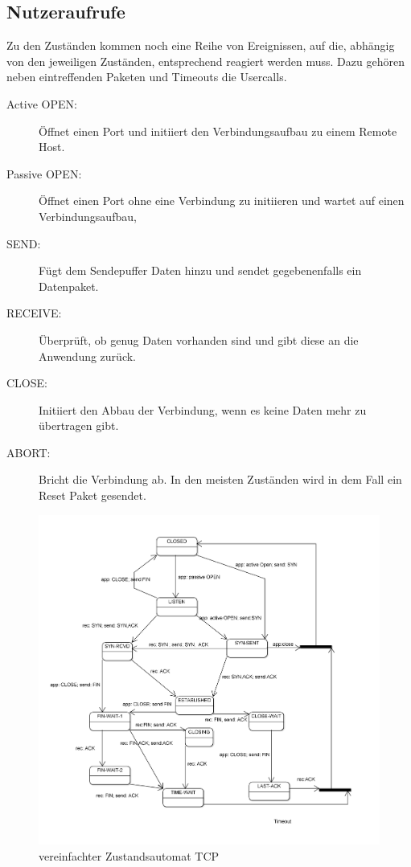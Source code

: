 \subsection{Nutzeraufrufe}
Zu den Zuständen kommen noch eine Reihe von Ereignissen, auf die, abhängig von den jeweiligen Zuständen, entsprechend reagiert werden muss. 
Dazu gehören neben eintreffenden Paketen und Timeouts die Usercalls.
\begin{description}
\item[Active OPEN: ]Öffnet einen Port und initiiert den Verbindungsaufbau zu einem Remote Host.
\item[Passive OPEN: ] Öffnet einen Port ohne eine Verbindung zu initiieren und wartet auf einen Verbindungsaufbau,
\item[SEND: ] Fügt dem Sendepuffer Daten hinzu und sendet gegebenenfalls ein Datenpaket.
\item[RECEIVE: ] Überprüft, ob genug Daten vorhanden sind und gibt diese an die Anwendung zurück.
\item[CLOSE: ] Initiiert den Abbau der Verbindung, wenn es keine Daten mehr zu  übertragen gibt.
\item[ABORT: ] Bricht die Verbindung ab. In den meisten Zuständen wird in dem Fall ein Reset Paket gesendet.
\end{description}\cite{TCPr,TCPm} 

\begin{figure}[htp]
	\centering
	\includegraphics[width=1\textwidth]{Graphics/tcp_Statemachine.png}
	\caption{vereinfachter Zustandsautomat TCP}

\end{figure}
\FloatBarrier
